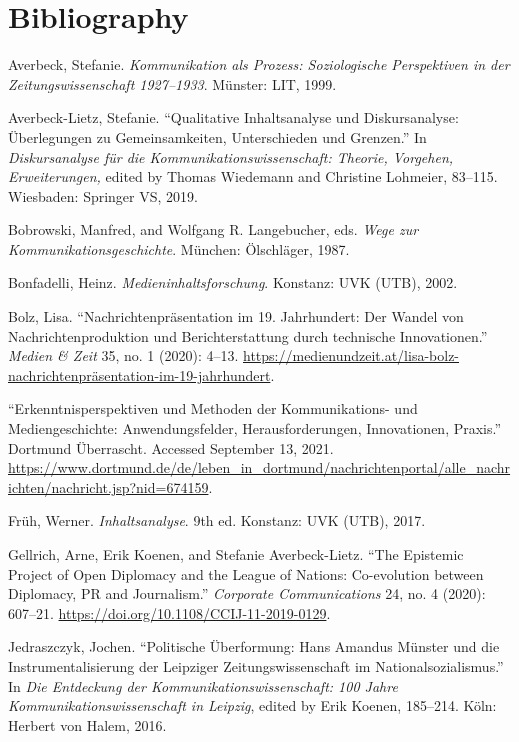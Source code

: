 \documentclass{tufte-handout}
\begin{document}
\section{Bibliography}\label{bibliography}

\begin{hangparas}{.25in}{1} 



Averbeck, Stefanie. \emph{Kommunikation als Prozess: Soziologische
Perspektiven in der Zeitungswissenschaft 1927--1933}. Münster: LIT,
1999.

Averbeck-Lietz, Stefanie. ``Qualitative Inhaltsanalyse und
Diskursanalyse: Überlegungen zu Gemeinsamkeiten, Unterschieden und
Grenzen.'' In \emph{Diskursanalyse für die Kommunikationswissenschaft:
Theorie, Vorgehen, Erweiterungen,} edited by Thomas Wiedemann and
Christine Lohmeier, 83--115. Wiesbaden: Springer VS, 2019.

Bobrowski, Manfred, and Wolfgang R. Langebucher, eds. \emph{Wege zur
Kommunikationsgeschichte}. München: Ölschläger, 1987.

Bonfadelli, Heinz. \emph{Medieninhaltsforschung}. Konstanz: UVK (UTB),
2002.

Bolz, Lisa. ``Nachrichtenpräsentation im 19. Jahrhundert: Der Wandel von
Nachrichtenproduktion und Berichterstattung durch technische
Innovationen.'' \emph{Medien \& Zeit} 35, no. 1 (2020): 4--13.
\href{https://medienundzeit.at/lisa-bolz-nachrichtenpräsentation-im-19-jahrhundert/}{https://medienundzeit.at/lisa-bolz-nachrichtenpräsentation-im-19-jahrhundert}.

``Erkenntnisperspektiven und Methoden der Kommunikations- und
Mediengeschichte: Anwendungsfelder, Herausforderungen, Innovationen,
Praxis.'' Dortmund Überrascht. Accessed September 13, 2021.
\url{https://www.dortmund.de/de/leben_in_dortmund/nachrichtenportal/alle_nachrichten/nachricht.jsp?nid=674159}.

Früh, Werner. \emph{Inhaltsanalyse}. 9th ed. Konstanz: UVK (UTB), 2017.

Gellrich, Arne, Erik Koenen, and Stefanie Averbeck-Lietz. ``The
Epistemic Project of Open Diplomacy and the League of Nations:
Co-evolution between Diplomacy, PR and Journalism.'' \emph{Corporate
Communications} 24, no. 4 (2020): 607--21.
\url{https://doi.org/10.1108/CCIJ-11-2019-0129}.

Jedraszczyk, Jochen. ``Politische Überformung: Hans Amandus Münster und
die Instrumentalisierung der Leipziger Zeitungswissenschaft im
Nationalsozialismus.'' In \emph{Die Entdeckung der
Kommunikationswissenschaft: 100 Jahre Kommunikationswissenschaft in
Leipzig}, edited by Erik Koenen, 185--214. Köln: Herbert von Halem,
2016.


\end{hangparas}
\end{document}
